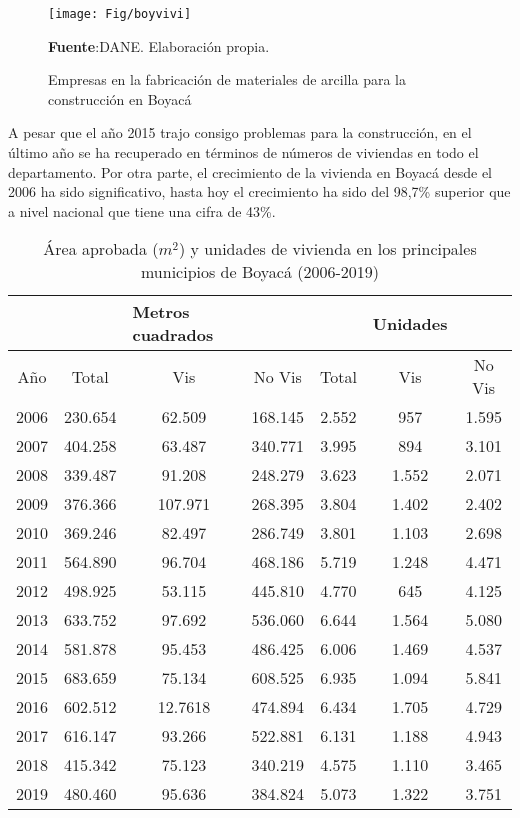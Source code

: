 \documentclass[12pt]{article}
\begin{document}
	\begin{figure}[H]
  	\centering 		
  	\caption{Empresas en la fabricación  de materiales de arcilla para la construcción en Boyacá}
	\texttt{[image: Fig/boyvivi]}
\raggedright  \scriptsize \textbf{Fuente}:DANE. Elaboración propia.
	\label{7}	
	\end{figure}
A pesar que el año 2015 trajo consigo problemas para la construcción, en el último año se ha recuperado en términos de números de viviendas en todo el departamento. Por otra parte, el crecimiento de la vivienda en Boyacá desde el 2006 ha sido significativo, hasta hoy el crecimiento ha sido del 98,7\% superior que a nivel nacional que tiene una cifra de 43\%. 
 


\begin{table}[H]
  \centering
  \caption{Área aprobada ($m^2$) y unidades de vivienda en los principales municipios de Boyacá (2006-2019)}
    \begin{tabular}{ c | c c c | c c c }
        \hline
          &       & \multicolumn{1}{l}{Metros cuadrados} &       &       & \multicolumn{1}{l}{Unidades} &  \\
           \hline
    \hline
       Año   &Total & Vis & No Vis &Total & Vis & No Vis\\
           \hline
    2006  & 230.654 & 62.509 & 168.145 & 2.552  & 957   & 1.595 \\
    2007  & 404.258 & 63.487 & 340.771 & 3.995  & 894   & 3.101 \\
    2008  & 339.487 & 91.208 & 248.279 & 3.623  & 1.552  & 2.071 \\
    2009  & 376.366 & 107.971 & 268.395 & 3.804  & 1.402  & 2.402 \\
    2010  & 369.246 & 82.497 & 286.749 & 3.801  & 1.103  & 2.698 \\
    2011  & 564.890 & 96.704 & 468.186 & 5.719  & 1.248  & 4.471 \\
    2012  & 498.925 & 53.115 & 445.810 & 4.770  & 645   & 4.125 \\
    2013  & 633.752 & 97.692 & 536.060 & 6.644  & 1.564  & 5.080 \\
    2014  & 581.878 & 95.453 & 486.425 & 6.006  & 1.469  & 4.537 \\
    2015  & 683.659 & 75.134 & 608.525 & 6.935  & 1.094  & 5.841 \\
    2016  & 602.512 & 12.7618 & 474.894 & 6.434  & 1.705  & 4.729 \\
    2017  & 616.147 & 93.266 & 522.881 & 6.131  & 1.188  & 4.943 \\
    2018  & 415.342 & 75.123 & 340.219 & 4.575  & 1.110  & 3.465 \\
    2019  & 480.460 & 95.636 & 384.824 & 5.073  & 1.322  & 3.751 \\
        \hline
    \end{tabular}%
  \label{tab:addlabel}%
\end{table}%
\end{document}
